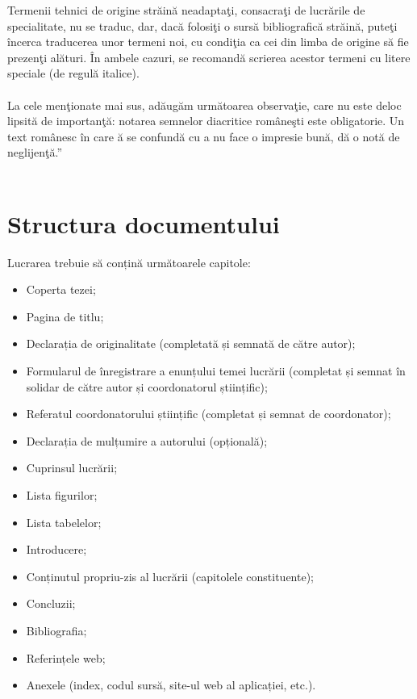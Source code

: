 Termenii tehnici de origine străină neadaptaţi, consacraţi de lucrările de specialitate, nu se traduc, dar, dacă folosiţi 
o sursă bibliografică străină, puteţi încerca traducerea unor termeni noi, cu condiţia ca cei din limba de origine să fie 
prezenţi alături. În ambele cazuri, se recomandă scrierea acestor termeni cu litere speciale (de regulă italice). \\~\\

La cele menţionate mai sus, adăugăm următoarea observaţie, care nu este deloc lipsită de importanţă: notarea semnelor 
diacritice româneşti este obligatorie. Un text românesc în care ă se confundă cu a nu face o impresie bună, dă o notă 
de neglijenţă.”\\~\\

\section{Structura documentului}

Lucrarea trebuie să conțină următoarele capitole:

\begin{itemize}
    \item Coperta tezei;
    \item Pagina de titlu;
    \item Declarația de originalitate (completată și semnată de către autor);
    \item Formularul de înregistrare a enunțului temei lucrării (completat și semnat în solidar de către autor și coordonatorul științific);
    \item Referatul coordonatorului științific (completat și semnat de coordonator);
    \item Declarația de mulțumire a autorului (opțională);
    \item Cuprinsul lucrării;
    \item Lista figurilor;
    \item Lista tabelelor;
    \item Introducere;
    \item Conținutul propriu-zis al lucrării (capitolele constituente);
    \item Concluzii;
    \item Bibliografia;
    \item Referințele web;
    \item Anexele (index, codul sursă, site-ul web al aplicației, etc.).
\end{itemize}

